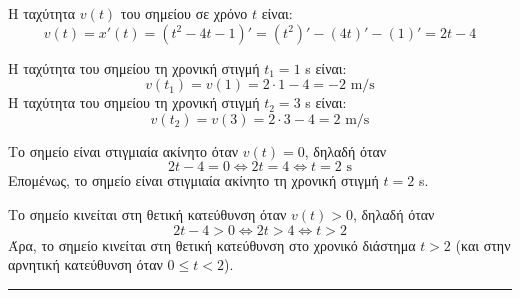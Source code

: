\begin{alist}
    \item Η ταχύτητα $v(t)$ του σημείου σε χρόνο $t$ είναι:
    \[ v(t) = x'(t) = (t^2 - 4t - 1)' = (t^2)' - (4t)' - (1)' = 2t - 4 \]
    \item Η ταχύτητα του σημείου τη χρονική στιγμή $t_1 = 1$ s είναι:
    \[ v(t_1) = v(1) = 2 \cdot 1 - 4 = -2 \text{ m/s} \]
    Η ταχύτητα του σημείου τη χρονική στιγμή $t_2 = 3$ s είναι:
    \[ v(t_2) = v(3) = 2 \cdot 3 - 4 = 2 \text{ m/s} \]
    \item Το σημείο είναι στιγμιαία ακίνητο όταν $v(t) = 0$, δηλαδή όταν
    \[ 2t - 4 = 0 \Leftrightarrow 2t = 4 \Leftrightarrow t = 2 \text{ s} \]
    Επομένως, το σημείο είναι στιγμιαία ακίνητο τη χρονική στιγμή $t = 2$ s.
    \item[δ)] Το σημείο κινείται στη θετική κατεύθυνση όταν $v(t) > 0$, δηλαδή όταν
    \[ 2t - 4 > 0 \Leftrightarrow 2t > 4 \Leftrightarrow t > 2 \]
    Άρα, το σημείο κινείται στη θετική κατεύθυνση στο χρονικό διάστημα $t > 2$ (και στην αρνητική κατεύθυνση όταν $0 \le t < 2$).
\end{alist}
\vspace{6mm}
\noindent\rule{\textwidth}{0.4pt}
\vspace{6mm}

